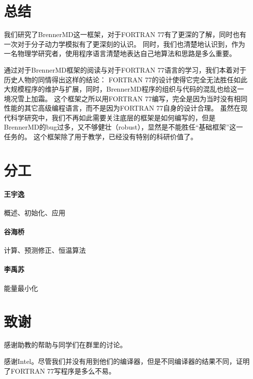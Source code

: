 \documentclass{ctexart}
\begin{document}
\section{总结}
我们研究了BrennerMD这一框架，对于FORTRAN 77有了更深的了解，同时也有一次对于分子动力学模拟有了更深刻的认识。
同时，我们也清楚地认识到，作为一名物理学研究者，使用程序语言清楚地表达自己地算法和思路是多么重要。

通过对于BrennerMD框架的阅读与对于FORTRAN 77语言的学习，我们本着对于历史人物的同情得出这样的结论：
FORTRAN 77的设计使得它完全无法胜任如此大规模程序的维护与扩展，同时，BrennerMD程序的组织与代码的混乱也给这一境况雪上加霜。
这个框架之所以用FORTRAN 77编写，完全是因为当时没有相同性能的其它高级编程语言，而不是因为FORTRAN 77自身的设计合理。
虽然在现代科学研究中，我们不再如此需要关注底层的框架是如何编写的，但是BrennerMD的bug过多，又不够健壮（robust），显然是不能胜任“基础框架”这一任务的。
这个框架除了用于教学，已经没有特别的科研价值了。

\section{分工}
\paragraph{王宇逸}概述、初始化、应用
\paragraph{谷海桥}计算、预测修正、恒温算法
\paragraph{李禹苏}能量最小化

\section{致谢}
感谢助教的帮助与同学们在群里的讨论。

感谢Intel。尽管我们并没有用到他们的编译器，但是不同编译器的结果不同，证明了FORTRAN 77写程序是多么不易。

\renewcommand{\refname}{参考文献}

\nocite{*}
\end{document}
